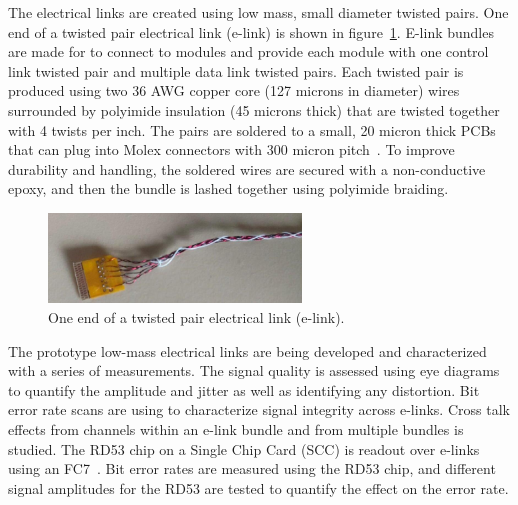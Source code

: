 \documentclass[a4paper,11pt]{article}
\begin{document}

The electrical links are created using low mass, small diameter twisted pairs.
One end of a twisted pair electrical link (e-link) is shown in figure~\ref{fig:elink}.
E-link bundles are made for to connect to modules and provide each module with one control link twisted pair and multiple data link twisted pairs.
Each twisted pair is produced using two 36 AWG copper core (127 microns in diameter) wires surrounded by polyimide insulation (45 microns thick) that are twisted together with 4 twists per inch.
The pairs are soldered to a small, 20 micron thick PCBs that can plug into Molex connectors with 300 micron pitch~\cite{ref:molex17,ref:molex33,ref:molex45}.
To improve durability and handling, the soldered wires are secured with a non-conductive epoxy, and then the bundle is lashed together using polyimide braiding.

\begin{figure}[htbp]
\centering
\includegraphics[width=0.6\textwidth,origin=c]{../figures/e-link-1.jpg}
\caption{
\label{fig:elink}
One end of a twisted pair electrical link (e-link).
}
\end{figure}




The prototype low-mass electrical links are being developed and characterized with a series of measurements.
The signal quality is assessed using eye diagrams to quantify the amplitude and jitter as well as identifying any distortion.
Bit error rate scans are using to characterize signal integrity across e-links.
Cross talk effects from channels within an e-link bundle and from multiple bundles is studied.
The RD53 chip on a Single Chip Card (SCC) is readout over e-links using an FC7~\cite{ref:fc7}.
Bit error rates are measured using the RD53 chip, and different signal amplitudes for the RD53 are tested to quantify the effect on the error rate.
\end{document}
